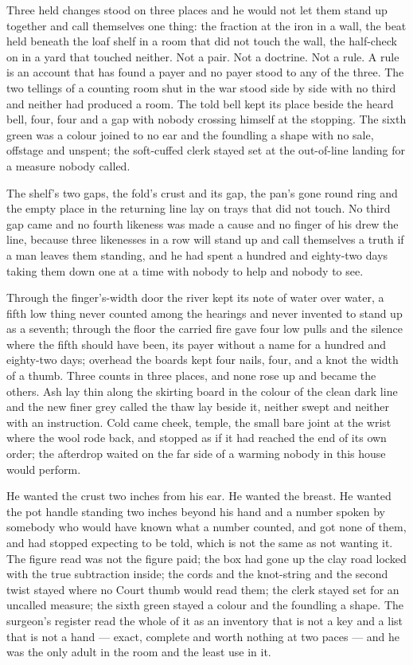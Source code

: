 Three held changes stood on three places and he would not let them stand up together and call themselves one thing: the fraction at the iron in a wall, the beat held beneath the loaf shelf in a room that did not touch the wall, the half-check on  in a yard that touched neither. Not a pair. Not a doctrine. Not a rule. A rule is an account that has found a payer and no payer stood to any of the three. The two tellings of a counting room shut in the war stood side by side with no third and neither had produced a room. The told bell kept its place beside the heard bell, four, four and a gap with nobody crossing himself at the stopping. The sixth green was a colour joined to no ear and the foundling a shape with no sale, offstage and unspent; the soft-cuffed clerk stayed set at the out-of-line landing for a measure nobody called.

The shelf's two gaps, the fold's crust and its gap, the pan's gone round ring and the empty place in the returning line lay on trays that did not touch. No third gap came and no fourth likeness was made a cause and no finger of his drew the line, because three likenesses in a row will stand up and call themselves a truth if a man leaves them standing, and he had spent a hundred and eighty-two days taking them down one at a time with nobody to help and nobody to see.

Through the finger's-width door the river kept its note of water over water, a fifth low thing never counted among the hearings and never invented to stand up as a seventh; through the floor the carried fire gave four low pulls and the silence where the fifth should have been, its payer without a name for a hundred and eighty-two days; overhead the boards kept four nails, four, and a knot the width of a thumb. Three counts in three places, and none rose up and became the others. Ash lay thin along the skirting board in the colour of the clean dark line and the new finer grey called the thaw lay beside it, neither swept and neither with an instruction. Cold came cheek, temple, the small bare joint at the wrist where the wool rode back, and stopped as if it had reached the end of its own order; the afterdrop waited on the far side of a warming nobody in this house would perform.

He wanted the crust two inches from his ear. He wanted the breast. He wanted the pot handle standing two inches beyond his hand and a number spoken by somebody who would have known what a number counted, and got none of them, and had stopped expecting to be told, which is not the same as not wanting it. The figure read was not the figure paid; the box had gone up the clay road locked with the true subtraction inside; the cords and the knot-string and the second twist stayed where no Court thumb would read them; the clerk stayed set for an uncalled measure; the sixth green stayed a colour and the foundling a shape. The surgeon's register read the whole of it as an inventory that is not a key and a list that is not a hand --- exact, complete and worth nothing at two paces --- and he was the only adult in the room and the least use in it.

